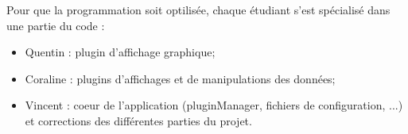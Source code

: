 
Pour que la programmation soit optilisée, chaque étudiant s'est spécialisé dans une partie du code :
\begin{itemize}
	\item Quentin : plugin d'affichage graphique;
	\item Coraline : plugins d'affichages et de manipulations des données;  
	\item Vincent : coeur de l'application (pluginManager, fichiers de configuration, ...) et corrections des différentes parties du projet.

\end{itemize}
